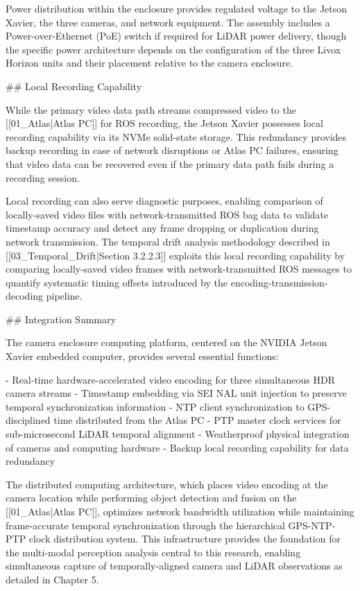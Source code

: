 \documentclass{erauthesis}
\begin{document}
Power distribution within the enclosure provides regulated voltage to the Jetson Xavier, the three cameras, and network equipment. The assembly includes a Power-over-Ethernet (PoE) switch if required for LiDAR power delivery, though the specific power architecture depends on the configuration of the three Livox Horizon units and their placement relative to the camera enclosure.

## Local Recording Capability

While the primary video data path streams compressed video to the [[01_Atlas|Atlas PC]] for ROS recording, the Jetson Xavier possesses local recording capability via its NVMe solid-state storage. This redundancy provides backup recording in case of network disruptions or Atlas PC failures, ensuring that video data can be recovered even if the primary data path fails during a recording session.

Local recording can also serve diagnostic purposes, enabling comparison of locally-saved video files with network-transmitted ROS bag data to validate timestamp accuracy and detect any frame dropping or duplication during network transmission. The temporal drift analysis methodology described in [[03_Temporal_Drift|Section 3.2.2.3]] exploits this local recording capability by comparing locally-saved video frames with network-transmitted ROS messages to quantify systematic timing offsets introduced by the encoding-transmission-decoding pipeline.

## Integration Summary

The camera enclosure computing platform, centered on the NVIDIA Jetson Xavier embedded computer, provides several essential functions:

- Real-time hardware-accelerated video encoding for three simultaneous HDR camera streams
- Timestamp embedding via SEI NAL unit injection to preserve temporal synchronization information
- NTP client synchronization to GPS-disciplined time distributed from the Atlas PC
- PTP master clock services for sub-microsecond LiDAR temporal alignment
- Weatherproof physical integration of cameras and computing hardware
- Backup local recording capability for data redundancy

The distributed computing architecture, which places video encoding at the camera location while performing object detection and fusion on the [[01_Atlas|Atlas PC]], optimizes network bandwidth utilization while maintaining frame-accurate temporal synchronization through the hierarchical GPS-NTP-PTP clock distribution system. This infrastructure provides the foundation for the multi-modal perception analysis central to this research, enabling simultaneous capture of temporally-aligned camera and LiDAR observations as detailed in Chapter 5.
\end{document}
